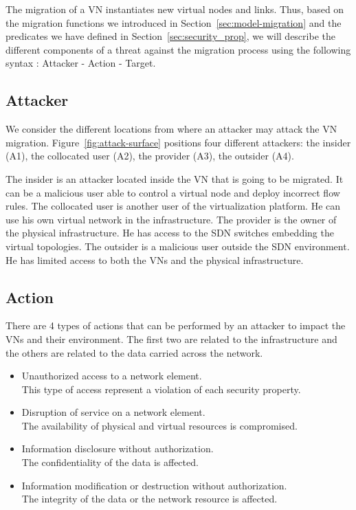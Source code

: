 \label{sec:attacker-model}
The migration of a VN instantiates new virtual nodes and links.
Thus, based on  the migration functions we introduced in Section~\ref{sec:model-migration} and the predicates we have defined in Section~\ref{sec:security_prop}, we will describe the different components of a threat against the migration process using the following syntax
: Attacker - Action - Target.



\subsection{Attacker}
We consider the different locations from where an attacker may attack the VN migration. 
Figure~\ref{fig:attack-surface} positions four different attackers: the insider (A1), the collocated user (A2), the provider (A3), the outsider (A4).

The insider is an attacker located inside the VN that is going to be migrated.
It can be a malicious user able to control a virtual node and deploy incorrect flow rules.
The collocated user is another user of the virtualization platform.
He can use his own virtual network in the infrastructure.
The provider is the owner of the physical infrastructure.
He has access to the SDN switches embedding the virtual topologies.
The outsider is a malicious user outside the SDN environment.
He has limited access to both the VNs and the physical infrastructure.

\subsection{Action}
There are 4 types of actions that can be performed by an attacker to impact the VNs and their environment.
The first two are related to the infrastructure and the others are related to the data carried across the network.
\begin{itemize}
\item Unauthorized access to a network element.
\\ This type of access represent a violation of each security property.
\item Disruption of service on a network element.
\\ The availability of physical and virtual resources is compromised.
\item Information disclosure without authorization.
\\ The confidentiality of the data is affected.
\item Information modification or destruction without authorization.
\\ The integrity of the data or the network resource is affected.
\end{itemize}

